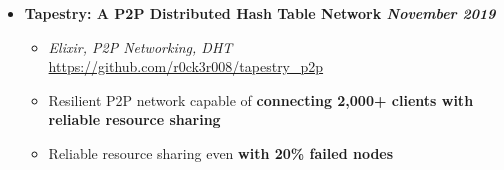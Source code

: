 \documentclass[9]{Resume}
\begin{document}
\begin{itemize}[noitemsep,nolistsep]
	\item[]\textbf{Tapestry: A P2P Distributed Hash Table Network \hfill \textit{November 2019}}
		\begin{itemize}[leftmargin=*]
			\setlength\itemsep{-0.25em}
			\item[\textbullet]\textit{Elixir, P2P Networking, DHT} \hfill \href{https://github.com/r0ck3r008/tapestry\_p2p}{{\scriptsize https://github.com/r0ck3r008/tapestry\_p2p}}
			\item[\textbullet]Resilient P2P network capable of \textbf{connecting 2,000+ clients with reliable resource sharing}
			\item[\textbullet]Reliable resource sharing even \textbf{with 20\% failed nodes}
		\end{itemize}

\end{itemize}
\end{document}
